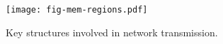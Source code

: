 \begin{figure}[t]
\texttt{[image: fig-mem-regions.pdf]}
\caption{Key structures involved in network transmission.}
\label{fig:mem-regions}
\end{figure}
